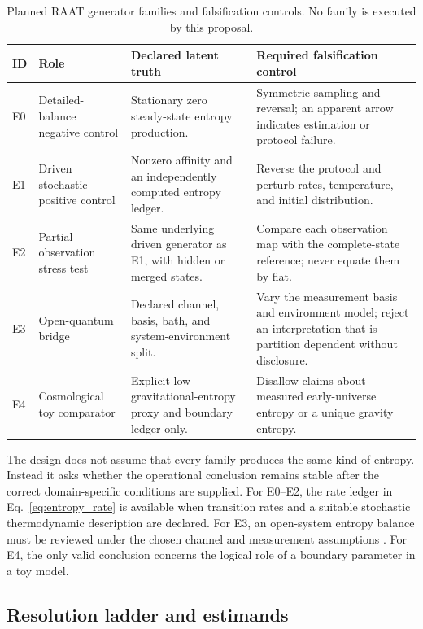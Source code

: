 \begin{table}[!t]
\caption{Planned RAAT generator families and falsification controls. No family is executed by this proposal.}
\label{tab:families}
\centering
\footnotesize
\begin{tabularx}{\textwidth}{p{}p{}Y Y}
\toprule
\textbf{ID} & \textbf{Role} & \textbf{Declared latent truth} & \textbf{Required falsification control}\\
\midrule
E0 & Detailed-balance negative control & Stationary zero steady-state entropy production. & Symmetric sampling and reversal; an apparent arrow indicates estimation or protocol failure.\\
E1 & Driven stochastic positive control & Nonzero affinity and an independently computed entropy ledger. & Reverse the protocol and perturb rates, temperature, and initial distribution.\\
E2 & Partial-observation stress test & Same underlying driven generator as E1, with hidden or merged states. & Compare each observation map with the complete-state reference; never equate them by fiat.\\
E3 & Open-quantum bridge & Declared channel, basis, bath, and system-environment split. & Vary the measurement basis and environment model; reject an interpretation that is partition dependent without disclosure.\\
E4 & Cosmological toy comparator & Explicit low-gravitational-entropy proxy and boundary ledger only. & Disallow claims about measured early-universe entropy or a unique gravity entropy.\\
\bottomrule
\end{tabularx}
\end{table}

The design does not assume that every family produces the same kind of entropy. Instead it asks whether the operational conclusion remains stable after the correct domain-specific conditions are supplied. For E0--E2, the rate ledger in Eq.~\eqref{eq:entropy_rate} is available when transition rates and a suitable stochastic thermodynamic description are declared. For E3, an open-system entropy balance must be reviewed under the chosen channel and measurement assumptions \cite{strasberg_winter2021,landi2021}. For E4, the only valid conclusion concerns the logical role of a boundary parameter in a toy model.

\subsection{Resolution ladder and estimands}

